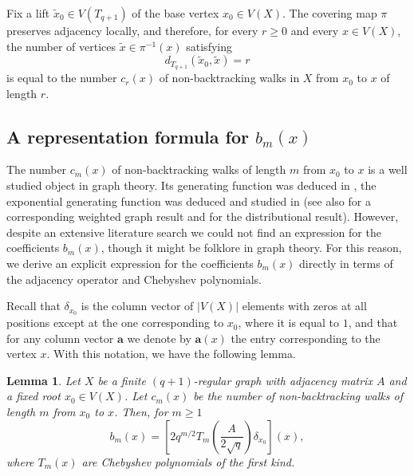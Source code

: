 \documentclass[reqno,10pt]{amsart}
\newtheorem{lemma}[theorem]{Lemma}
\theoremstyle{definition}
\numberwithin{equation}{section}
\begin{document}
Fix a lift $\widetilde x_0\in V(T_{q+1})$ of the base vertex $x_0\in V(X)$. The covering map $\pi$ preserves adjacency locally, and therefore, for every $r\ge0$ and every $x\in V(X)$, the number of vertices $\widetilde x\in\pi^{-1}(x)$ satisfying
\[
d_{T_{q+1}}(\widetilde x_0,\widetilde x)=r
\]
is equal to the number $c_r(x)$ of non-backtracking walks in $X$ from $x_0$ to $x$ of length $r$.

\subsection{A representation formula for $b_m(x)$}

The number $c_m(x)$ of non-backtracking walks of length $m$ from $x_0$ to $x$ is a well studied object in graph theory. Its generating function was deduced in \cite{Fr91}, the exponential generating function was deduced and studied in \cite{AGHN18} (see also \cite{AHNW24} for a corresponding weighted graph result and \cite{OS14} for the distributional result). However, despite an extensive literature search we could not find an expression for the coefficients $b_m(x)$, though it might be folklore in graph theory. For this reason, we derive an explicit expression for the coefficients $b_m(x)$ directly in terms of the adjacency operator and Chebyshev polynomials.

Recall that $\delta_{x_0}$ is the column vector of $|V(X)|$ elements with zeros at all positions except at the one corresponding to $x_0$, where it is equal to $1$, and that for any column vector $\mathbf a$ we denote by $\mathbf a(x)$ the entry corresponding to the vertex $x$. With this notation, we have the following lemma.


\begin{lemma}\label{lemma:bm_from_cm}
Let $X$ be a finite $(q+1)$-regular graph with adjacency matrix $A$ and a fixed root
$x_0\in V(X)$. Let $c_m(x)$ be the number of non-backtracking walks of length $m$
from $x_0$ to $x$. Then, for $m\ge1$
\begin{equation*}\label{eq. bm as Cheb}
b_m(x)
=
\left[
2q^{m/2}T_m\!\left(\frac{A}{2\sqrt q} \right)\delta_{x_0}
\right](x),
\end{equation*}
where $T_m(x)$ are Chebyshev polynomials of the first kind.
\end{lemma}
\end{document}
